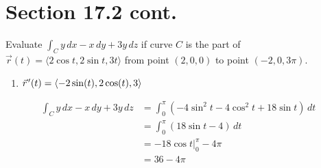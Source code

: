 \documentclass[letter,11pt]{article}
\newcommand{\pvec}[1]{\vec{#1}\mkern2mu\vphantom{#1}}
\begin{document}
\section*{Section 17.2 cont.} 
Evaluate $\int_{C} y\, dx - x\, dy +3y \, dz$ if curve $C$ is the part of $\vec{r} (t) =\langle 2 \cos t, 2 \sin t, 3t \rangle$ from point $(2, 0, 0)$ to point $(-2, 0, 3\pi)$.
\begin{enumerate}[label=\alph*.)]
    \item $\pvec{r}'(t)=\langle -2\sin(t),2\cos(t), 3 \rangle$
\end{enumerate}
\begin{align*}
\int_C y\, dx - x\, dy + 3y\, dz &= \int_0^\pi (-4\sin^2 t - 4\cos^2 t + 18\sin t)\,dt \\
&= \int_0^\pi (18\sin t - 4)\,dt \\
&= -18\cos t \bigg|_0^\pi - 4\pi \\
&= \boxed{36 - 4\pi}
\end{align*}
\end{document}
